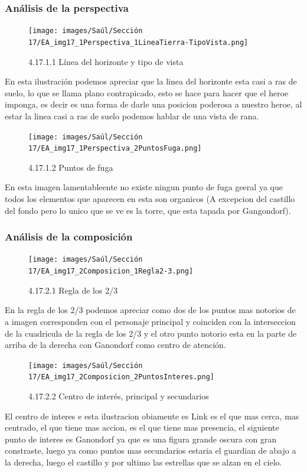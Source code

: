 \documentclass[12pt]{article}
\begin{document}
    
    \subsubsection{Análisis de la perspectiva}


      \begin{figure}[H]
        \centering
        \texttt{[image: images/Saúl/Sección 17/EA\_img17\_1Perspectiva\_1LineaTierra-TipoVista.png]}
        \caption{\small 4.17.1.1 Línea del horizonte y tipo de vista}
      \end{figure}
      En esta ilustración podemos apreciar que la linea del horizonte esta casi a ras de suelo, lo que se llama plano contrapicado, esto se hace para hacer que el heroe imponga, es decir es una forma de darle una posicion poderosa a nuestro heroe, al estar la linea casi a ras de suelo podemos hablar de una vista de rana.


      \begin{figure}[H]
        \centering
        \texttt{[image: images/Saúl/Sección 17/EA\_img17\_1Perspectiva\_2PuntosFuga.png]}
        \caption{\small 4.17.1.2 Puntos de fuga}
      \end{figure}
      En esta imagen lamentableente no existe ningun punto de fuga geeral ya que todos los elementos que aparecen en esta son organicos (A excepcion del castillo del fondo pero lo unico que se ve es la torre, que esta tapada por Gangondorf).



    \subsubsection{Análisis de la composición}

        
      \begin{figure}[H]
        \centering
        \texttt{[image: images/Saúl/Sección 17/EA\_img17\_2Composicion\_1Regla2-3.png]}
        \caption{\small 4.17.2.1 Regla de los 2/3}
      \end{figure}
      En la regla de los 2/3 podemos apreciar como dos de los puntos mas notorios de a imagen corresponden con el personaje principal y coinciden con la interseccion de la cuadricula de la regla de los 2/3 y el otro punto notorio esta en la parte de arriba de la derecha con Ganondorf como centro de atención.


      \begin{figure}[H]
        \centering
        \texttt{[image: images/Saúl/Sección 17/EA\_img17\_2Composicion\_2PuntosInteres.png]}
        \caption{\small 4.17.2.2 Centro de interés, principal y secundarios}
      \end{figure}
      El centro de interes e esta ilustracion obiamente es Link es el que mas cerca, mas centrado, el que tiene mas accion, es el que tiene mas presencia, el siguiente punto de interes es Ganondorf ya que es una figura grande oscura con gran constraste, luego ya como puntos mas secundarios estaria el guardian de abajo a la derecha, luego el castillo y por ultimo las estrellas que se alzan en el cielo.
\end{document}
